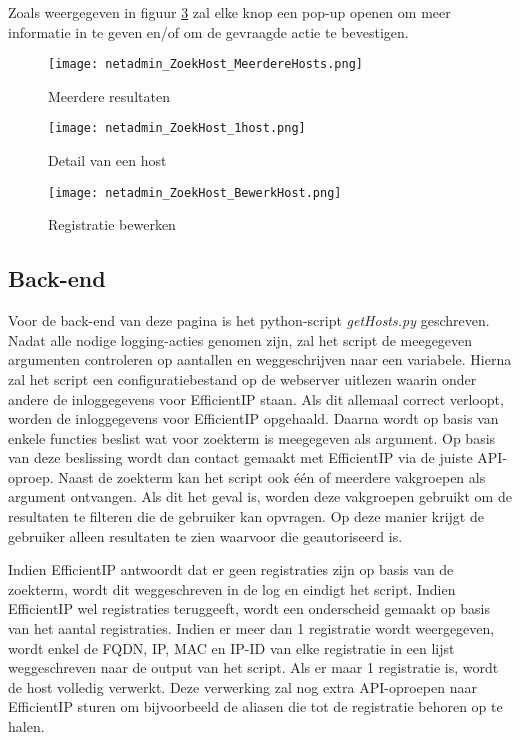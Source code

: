 Zoals weergegeven in figuur \ref{fig:netadmin_ZoekHost_BewerkHost} zal elke knop een pop-up openen om meer informatie in te geven en/of om de gevraagde actie te bevestigen.
\begin{figure}[H]
    \texttt{[image: netadmin\_ZoekHost\_MeerdereHosts.png]}
    \caption{Meerdere resultaten}
    \label{fig:netadmin_ZoekHost_MeerdereHosts}
\end{figure}
\begin{figure}[H]
    \texttt{[image: netadmin\_ZoekHost\_1host.png]}
    \caption{Detail van een host}
    \label{fig:netadmin_ZoekHost_1host}
\end{figure}
\begin{figure}[H]
    \texttt{[image: netadmin\_ZoekHost\_BewerkHost.png]}
    \caption{Registratie bewerken}
    \label{fig:netadmin_ZoekHost_BewerkHost}
\end{figure}
\subsection{Back-end}
Voor de back-end van deze pagina is het python-script \textit{getHosts.py} geschreven. Nadat alle nodige logging-acties genomen zijn, zal het script de meegegeven argumenten controleren  op aantallen en weggeschrijven naar een variabele. Hierna zal het script een configuratiebestand op de webserver uitlezen waarin onder andere de inloggegevens voor EfficientIP staan. Als dit allemaal correct verloopt, worden de inloggegevens voor EfficientIP opgehaald. Daarna wordt op basis van enkele functies beslist wat voor zoekterm is meegegeven als argument. Op basis van deze beslissing wordt dan contact gemaakt met EfficientIP via de juiste API-oproep. Naast de zoekterm kan het script ook één of meerdere vakgroepen als argument ontvangen. Als dit het geval is, worden deze vakgroepen gebruikt om de resultaten te filteren die de gebruiker kan opvragen. Op deze manier krijgt de gebruiker alleen resultaten te zien waarvoor die geautoriseerd is.

Indien EfficientIP antwoordt dat er geen registraties zijn op basis van de zoekterm, wordt dit weggeschreven in de log en eindigt het script. Indien EfficientIP wel registraties teruggeeft, wordt een onderscheid gemaakt op basis van het aantal registraties.
Indien er meer dan 1 registratie wordt weergegeven, wordt enkel de FQDN, IP, MAC en IP-ID van elke registratie in een lijst weggeschreven naar de output van het script. Als er maar 1 registratie is, wordt de host volledig verwerkt. Deze verwerking zal nog extra API-oproepen naar EfficientIP sturen om bijvoorbeeld de aliasen die tot de registratie behoren op te halen.

